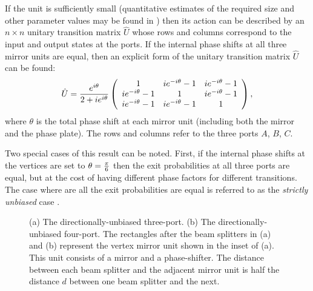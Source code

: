 \documentclass[twocolumn,amsmath, amssymb, superscriptaddress, pra]{revtex4}
\begin{document}
If the unit is sufficiently small (quantitative estimates of the required
size and other parameter values may be found in \cite{threeport}) then its
action can be described by an $n\times n$ unitary transition matrix $\hat U$
whose rows and columns correspond to the input and output states at the
ports. If the internal phase shifts at all three mirror units are equal, then
an explicit form of the unitary transition matrix $\hat U$ can be found:
\begin{equation}\hat U={{e^{i\theta}}\over {2+ie^{i\theta}}}\left( \begin{array}{ccc} 1 & ie^{-i\theta}-1 & ie^{-i\theta}-1 \\
ie^{-i\theta}-1 & 1 & ie^{-i\theta}-1\\ ie^{-i\theta}-1 & ie^{-i\theta}-1& 1
\end{array}\right) ,\label{general}\end{equation} where $\theta$ is the total phase shift at each mirror unit (including both the mirror and the phase plate).
The rows and columns refer to the three ports $A$, $B$, $C$.

Two special cases of this result can be noted. First, if the internal phase
shifts at the vertices are set to $\theta ={\pi \over 6}$ then
the exit probabilities at all three ports are equal, but at the cost of having
different phase factors for different transitions. The case where are all the exit probabilities are equal is referred to as the \emph{strictly unbiased} case
\cite{simham}.

\begin{figure}
\begin{center}
\qquad  {}
\caption{(a) The directionally-unbiased three-port. (b) The directionally-unbiased four-port. The rectangles after the beam splitters in (a) and (b) represent the vertex mirror unit shown in the inset of (a). This unit consists of a mirror and a phase-shifter. The distance between each beam splitter and the adjacent mirror unit is half the distance $d$ between one beam splitter and the next. }\label{nportfig}
\end{center}
\end{figure}
\end{document}
